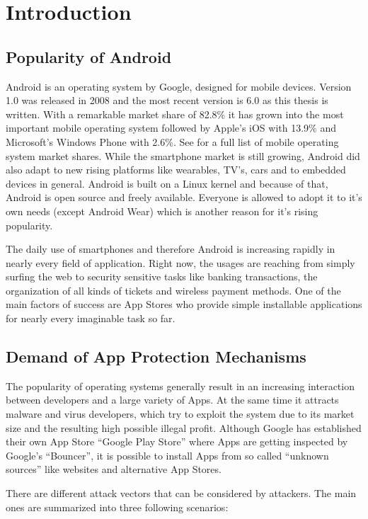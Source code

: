 \chapter{Introduction}\label{chapter:android_status_quo}

\section{Popularity of Android}
Android is an operating system by Google,
designed for mobile devices. Version 1.0 was released
in 2008 and the most recent version is 6.0 as this thesis
is written. With a remarkable market share of 82.8\%
it has grown into the most important mobile operating system
followed by Apple's iOS with 13.9\% and Microsoft's Windows
Phone with 2.6\%. See \parencite{marketshare} for a full list
of mobile operating system market shares. While the smartphone
market is still growing, Android did also adapt to new
rising platforms like wearables, TV's, cars and to
embedded devices in general. Android is built on a Linux kernel
and because of that, Android is open source and freely
available. Everyone is allowed to adopt it to it's own needs
(except Android Wear) which is another reason for it's
rising popularity.

The daily use of smartphones and therefore Android is increasing
rapidly in nearly every field of application. Right now, the usages
are reaching from simply surfing the web to security sensitive tasks
like banking transactions, the organization of all kinds of tickets
and wireless payment methods.
One of the main factors of success are App Stores who provide simple
installable applications for nearly every imaginable task so far.

\section{Demand of App Protection Mechanisms}
The popularity of operating systems generally result in an increasing interaction between developers and a large variety of Apps. At the same time it attracts malware and virus developers, which try to exploit the system due to its market size and the resulting high possible illegal profit.
Although Google has established their own App Store
``Google Play Store'' where Apps are getting inspected by Google's ``Bouncer'',
it is possible to install Apps from so called ``unknown sources''
like websites and alternative App Stores.

There are different attack vectors that can be considered by attackers.
The main ones are summarized into three following scenarios:

